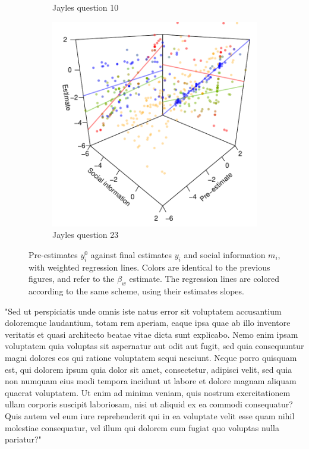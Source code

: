 \documentclass[10pt,a4paper,twocolumn,lineno]{article}
\begin{document}
\begin{figure}[htbp]
\begin{subfigure}[b]{.24\textwidth}
		\caption{Jayles question 10}
	\end{subfigure}
	\begin{subfigure}[b]{.24\textwidth}
		\includegraphics[width=\textwidth]{../plots/jayles23_vs_xp3d.pdf}
		\caption{Jayles question 23}
	\end{subfigure}
	\caption{Pre-estimates $y_i^0$ against final estimates $y_i$ and social information $m_i$, with weighted regression lines. Colors are identical to the previous figures, and refer to the $\beta_w$ estimate. The regression lines are colored according to the same scheme, using their estimates slopes.}\label{fig: Jayles 3d}
\end{figure}



\vspace*{80px}

"Sed ut perspiciatis unde omnis iste natus error sit voluptatem accusantium doloremque laudantium, totam rem aperiam, eaque ipsa quae ab illo inventore veritatis et quasi architecto beatae vitae dicta sunt explicabo. Nemo enim ipsam voluptatem quia voluptas sit aspernatur aut odit aut fugit, sed quia consequuntur magni dolores eos qui ratione voluptatem sequi nesciunt. Neque porro quisquam est, qui dolorem ipsum quia dolor sit amet, consectetur, adipisci velit, sed quia non numquam eius modi tempora incidunt ut labore et dolore magnam aliquam quaerat voluptatem. Ut enim ad minima veniam, quis nostrum exercitationem ullam corporis suscipit laboriosam, nisi ut aliquid ex ea commodi consequatur? Quis autem vel eum iure reprehenderit qui in ea voluptate velit esse quam nihil molestiae consequatur, vel illum qui dolorem eum fugiat quo voluptas nulla pariatur?"
\end{document}
